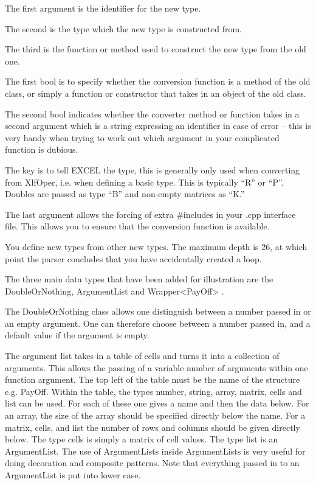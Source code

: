 \documentclass[12pt,reqno]{amsart}
\numberwithin{equation}{section}
\numberwithin{figure}{section}
\begin{document}
The first argument is the identifier for the new type.

The second is the type which the new type is constructed from. 

The third is the function or method used to construct the new type
from the old one. 

The first bool is to specify whether the conversion function is a
method of the old class, or simply a function or constructor that
takes in an object of the old class. 

The second bool indicates whether the converter method or function
takes in a second argument which is a string expressing an identifier
in case of error -- this is very handy when trying to work out which
argument in your complicated function is dubious. 

The key is to tell EXCEL the type, this is generally only used when converting
from XlfOper, i.e. when defining a basic type. This is typically ``R''
or ``P''. Doubles are passed as type ``B'' and non-empty matrices as ``K.''

The last argument allows the forcing of extra \#includes in your .cpp
interface file. This allows you to ensure that the conversion function
is available. 

You define new types from other new types. The maximum depth is 26, at
which point the parser concludes that you have accidentally created a
loop. 

The three main data types that have been added for illustration are the
DoubleOrNothing, ArgumentList and Wrapper<PayOff> . 

The DoubleOrNothing class allows one distinguish between a number passed in
or an empty argument. One can therefore choose between a number passed
in, and a default value if the argument is empty. 

The argument list takes in a table of cells and turns it into a
collection of arguments. This allows the passing of a variable number of
arguments within one function argument. The top left of the table must be
the name of the structure e.g. PayOff. Within the table, the types
number, string, array, matrix, cells and list can be used. For each of
these one gives a name and then the data below. For an array, the size
of the array should be specified directly below the name. For a
matrix, cells, and list the number of rows and columns should be given
directly below. The type cells is simply a matrix of cell values. The
type list is an ArgumentList. The use of
ArgumentLists inside ArgumentLists is very useful for doing
decoration and composite patterns. Note that everything passed in to an
ArgumentList is put into lower case. 
\end{document}
